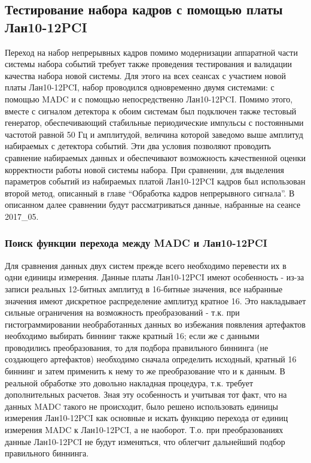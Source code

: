 \documentclass[a4paper,14pt]{extreport}
\begin{document}
\subsection{Тестирование набора кадров с помощью платы Лан10-12PCI}
Переход на набор непрерывных кадров помимо модернизации аппаратной части системы набора событий требует также проведения тестирования и валидации качества набора новой системы. Для этого на всех сеансах с участием новой платы Лан10-12PCI, набор проводился одновременно двумя системами: с помощью MADC и с помощью непосредственно Лан10-12PCI. Помимо этого, вместе с сигналом детектора к обоим системам был подключен также тестовый генератор, обеспечивающий стабильные периодические импульсы с постоянными частотой равной 50 Гц и амплитудой, величина которой заведомо выше амплитуд набираемых с детектора событий. Эти два условия позволяют проводить сравнение набираемых данных и обеспечивают возможность качественной оценки корректности работы новой системы набора. При сравнении, для выделения параметров событий из набираемых платой Лан10-12PCI кадров был использован второй метод, описанный в главе “Обработка кадров непрерывного сигнала”. В описанном далее сравнении будут рассматриваться данные, набранные на сеансе 2017\_05.

\subsubsection{Поиск функции перехода между MADC и Лан10-12PCI}
Для сравнения данных двух систем прежде всего необходимо перевести их в одни единицы измерения. Данные платы Лан10-12PCI имеют особенность - из-за записи реальных 12-битных амплитуд в 16-битные значения, все набранные значения имеют дискретное распределение амплитуд кратное 16. Это накладывает сильные ограничения на возможность преобразований - т.к. при гистограммировании необработанных данных во избежания появления артефактов необходимо выбирать биннинг также кратный 16; если же с данными проводились преобразования, то для подбора правильного биннинга (не создающего артефактов) необходимо сначала определить исходный, кратный 16 биннинг и затем применить к нему то же преобразование что и к данным. В реальной обработке это довольно накладная процедура, т.к. требует дополнительных расчетов. Зная эту особенность и учитывая тот факт, что на данных MADC такого не происходит, было решено использовать единицы измерения Лан10-12PCI как основные и искать функцию перехода от единиц измерения MADC к  Лан10-12PCI, а не наоборот. Т.о. при преобразованиях данные Лан10-12PCI не будут изменяться, что облегчит дальнейший подбор правильного биннинга.
\end{document}
